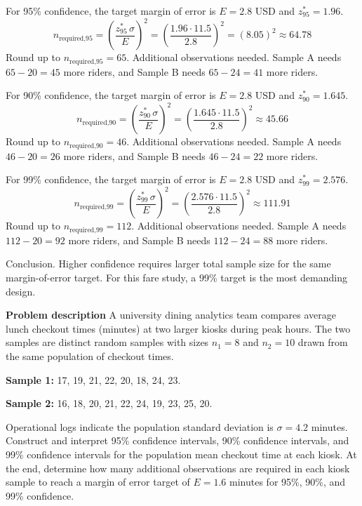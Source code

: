 \begin{ExamProblems}
		For 95\% confidence, the target margin of error is $E = 2.8$ USD and $z^*_{95} = 1.96$.
		\[
		n_{\text{required,95}} = \left(\frac{z^*_{95}\,\sigma}{E}\right)^2
		= \left(\frac{1.96 \cdot 11.5}{2.8}\right)^2
		= \left(8.05\right)^2
		\approx 64.78
		\]
		Round up to $n_{\text{required,95}} = 65$.
		Additional observations needed.
		Sample A needs $65 - 20 = 45$ more riders, and Sample B needs $65 - 24 = 41$ more riders.
		
		For 90\% confidence, the target margin of error is $E = 2.8$ USD and $z^*_{90} = 1.645$.
		\[
		n_{\text{required,90}} = \left(\frac{z^*_{90}\,\sigma}{E}\right)^2
		= \left(\frac{1.645 \cdot 11.5}{2.8}\right)^2
		\approx 45.66
		\]
		Round up to $n_{\text{required,90}} = 46$.
		Additional observations needed.
		Sample A needs $46 - 20 = 26$ more riders, and Sample B needs $46 - 24 = 22$ more riders.
		
		For 99\% confidence, the target margin of error is $E = 2.8$ USD and $z^*_{99} = 2.576$.
		\[
		n_{\text{required,99}} = \left(\frac{z^*_{99}\,\sigma}{E}\right)^2
		= \left(\frac{2.576 \cdot 11.5}{2.8}\right)^2
		\approx 111.91
		\]
		Round up to $n_{\text{required,99}} = 112$.
		Additional observations needed.
		Sample A needs $112 - 20 = 92$ more riders, and Sample B needs $112 - 24 = 88$ more riders.
		
		Conclusion.
		Higher confidence requires larger total sample size for the same margin-of-error target.
		For this fare study, a 99\% target is the most demanding design.

		\newpage
		\item
		\textbf{Problem description}
		A university dining analytics team compares average lunch checkout times (minutes) at two larger kiosks during peak hours.
		The two samples are distinct random samples with sizes $n_1 = 8$ and $n_2 = 10$ drawn from the same population of checkout times.
		
		\textbf{Sample 1:} 17, 19, 21, 22, 20, 18, 24, 23.
		
		\textbf{Sample 2:} 16, 18, 20, 21, 22, 24, 19, 23, 25, 20.
		
		Operational logs indicate the population standard deviation is $\sigma = 4.2$ minutes.
		Construct and interpret 95\% confidence intervals, 90\% confidence intervals, and 99\% confidence intervals for the population mean checkout time at each kiosk.
		At the end, determine how many additional observations are required in each kiosk sample to reach a margin of error target of $E = 1.6$ minutes for 95\%, 90\%, and 99\% confidence.
		

\end{ExamProblems}
